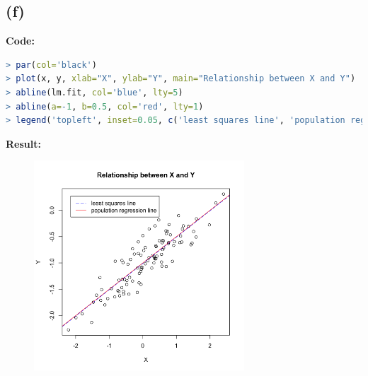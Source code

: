 \documentclass[twoside]{homework}
\begin{document}
\subsection*{(f)}
\textbf{Code:}
\begin{lstlisting}[language=R]
> par(col='black')
> plot(x, y, xlab="X", ylab="Y", main="Relationship between X and Y")
> abline(lm.fit, col='blue', lty=5)
> abline(a=-1, b=0.5, col='red', lty=1)
> legend('topleft', inset=0.05, c('least squares line', 'population regression line'), lty=c(5, 1), col=c('blue', 'red'), bty = "o")
\end{lstlisting}
\textbf{Result:}
\begin{figure}[!h]
\begin{center}
\includegraphics[width=0.7\textwidth]{HW1_P3_f.png}
\end{center}
\label{fig:HW1_P3_f}
\end{figure}
\end{document}
